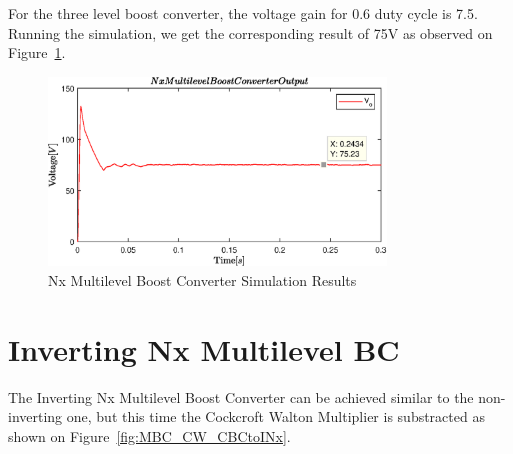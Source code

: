 \vspace{-4mm}
For the three level boost converter, the voltage gain for 0.6 duty cycle is 7.5. Running the simulation, we get the corresponding result of 75V as observed on Figure~\ref{fig:MBC_SimResults}.
\vspace{-2mm}
\begin{figure}[H]
   \centering
   \includegraphics[width=0.8\textwidth]{figures/yMultilevel/Non-invertingNx.eps}
    \caption{Nx Multilevel Boost Converter Simulation Results}
	\label{fig:MBC_SimResults}
\end{figure}

\section{Inverting Nx Multilevel BC}\label{ch:IMBC}

The Inverting Nx Multilevel Boost Converter can be achieved similar to the non-inverting one, but this time the Cockcroft Walton Multiplier is substracted as shown on Figure~\ref{fig:MBC_CW_CBCtoINx}. \cite{Bhaskar2016}

